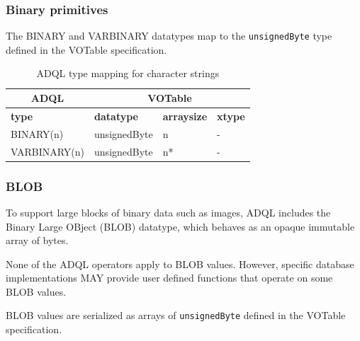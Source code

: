\documentclass[11pt,a4paper]{ivoa}
\newcommand{\VOTspec}{VOTable specification\xspace}
\begin{document}
\subsubsection{Binary primitives}
\label{sec:types.binary.primitive}

The BINARY and VARBINARY datatypes map to the \verb:unsignedByte: type defined
in the \VOTspec.

\begin{table}[thm]\footnotesize
    \begin{tabular}
        {|p{}|p{}|p{}|p{}|}
        \hline

        \hline
        \multicolumn{1}{|c|}{\textbf{ADQL}} &
        \multicolumn{3}{|c|}{\textbf{VOTable}}
        \tabularnewline
        
        \hline
        \textbf{type} &
        \textbf{datatype} &
        \textbf{arraysize} &
        \textbf{xtype}
        \tabularnewline

        \hline
        BINARY(n) &
        unsignedByte &
        n &
        -
        \tabularnewline

        \hline
        VARBINARY(n) &
        unsignedByte &
        n* &
        -
        \tabularnewline

        \hline
    \end{tabular}
    \caption{ADQL type mapping for character strings}
    \label{table:types.binary.primitive}
\end{table}

\subsubsection{BLOB}
\label{sec:types.binary.blob}

To support large blocks of binary data such as images,
ADQL includes the Binary Large OBject (BLOB) datatype,
which behaves as an opaque immutable array of bytes.

None of the ADQL operators apply to BLOB values.
However, specific database implementations MAY provide user
defined functions that operate on some BLOB values.

BLOB values are serialized as arrays of \verb:unsignedByte: defined
in the \VOTspec.
\end{document}
